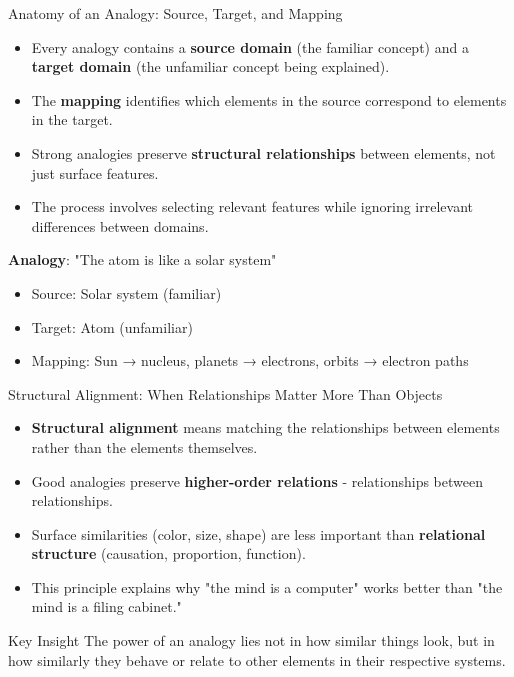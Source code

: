\documentclass{beamer}
\begin{document}
	\begin{frame}{Anatomy of an Analogy: Source, Target, and Mapping}
		\begin{itemize}
			\item Every analogy contains a \textbf{source domain} (the familiar concept) and a \textbf{target domain} (the unfamiliar concept being explained).
			\item The \textbf{mapping} identifies which elements in the source correspond to elements in the target.
			\item Strong analogies preserve \textbf{structural relationships} between elements, not just surface features.
			\item The process involves selecting relevant features while ignoring irrelevant differences between domains.
		\end{itemize}
		
		\begin{example}
			\textbf{Analogy}: "The atom is like a solar system"
			\begin{itemize}
				\item Source: Solar system (familiar)
				\item Target: Atom (unfamiliar)
				\item Mapping: Sun → nucleus, planets → electrons, orbits → electron paths
			\end{itemize}
		\end{example}
	\end{frame}
	
	\begin{frame}{Structural Alignment: When Relationships Matter More Than Objects}
		\begin{itemize}
			\item \textbf{Structural alignment} means matching the relationships between elements rather than the elements themselves.
			\item Good analogies preserve \textbf{higher-order relations} - relationships between relationships.
			\item Surface similarities (color, size, shape) are less important than \textbf{relational structure} (causation, proportion, function).
			\item This principle explains why "the mind is a computer" works better than "the mind is a filing cabinet."
		\end{itemize}
		
		\begin{alertblock}{Key Insight}
			The power of an analogy lies not in how similar things look, but in how similarly they behave or relate to other elements in their respective systems.
		\end{alertblock}
	\end{frame}
	
\end{document}
